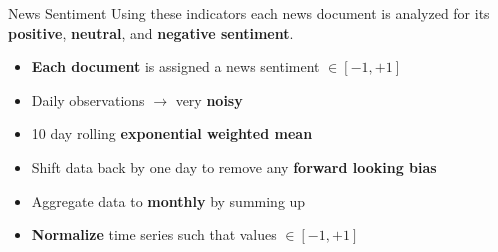 

\begin{frame}{News Sentiment}
Using these indicators each news document is analyzed for its \textbf{positive}, \textbf{neutral}, and \textbf{negative sentiment}. 
\begin{itemize}
    \item \textbf{Each document} is assigned a news sentiment $\in [-1, +1]$
    \item Daily observations $\rightarrow$ very \textbf{noisy}
    \item 10 day rolling \textbf{exponential weighted mean}
    \item Shift data back by one day to remove any \textbf{forward looking bias}
    \item Aggregate data to \textbf{monthly} by summing up
    \item \textbf{Normalize} time series such that values $\in [-1, +1]$
\end{itemize}
\end{frame}






